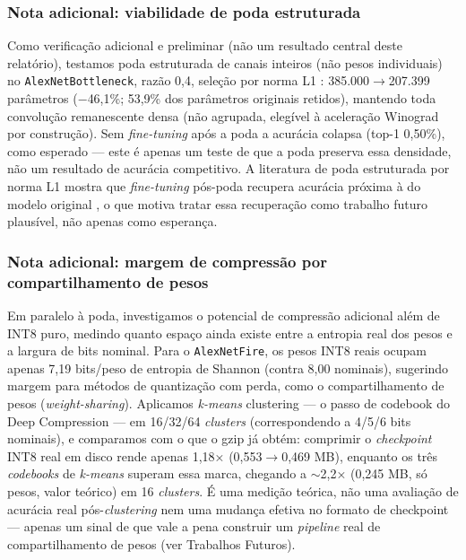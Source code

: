 \documentclass[conference]{IEEEtran}
\begin{document}
\subsubsection{Nota adicional: viabilidade de poda estruturada}

Como verificação adicional e preliminar (não um resultado central deste relatório), testamos poda
estruturada de canais inteiros (não pesos individuais) no \texttt{AlexNetBottleneck}, razão 0,4,
seleção por norma L1 \cite{li2017pruning}: 385.000$\to$207.399 parâmetros ($-$46,1\%; 53,9\% dos
parâmetros originais retidos), mantendo toda convolução remanescente densa (não agrupada,
elegível à aceleração Winograd por construção). Sem \textit{fine-tuning} após a poda a acurácia
colapsa (top-1 0,50\%), como esperado — este é apenas um teste de que a poda preserva essa
densidade, não um resultado de acurácia competitivo. A literatura de poda estruturada por
norma L1 mostra que \textit{fine-tuning} pós-poda recupera acurácia próxima à do modelo original
\cite{li2017pruning}, o que motiva tratar essa recuperação como trabalho futuro plausível, não
apenas como esperança.

\subsubsection{Nota adicional: margem de compressão por compartilhamento de pesos}

Em paralelo à poda, investigamos o potencial de compressão adicional além de INT8 puro,
medindo quanto espaço ainda existe entre a entropia real dos pesos e a largura de bits nominal.
Para o \texttt{AlexNetFire}, os pesos INT8 reais ocupam apenas 7,19 bits/peso de entropia de Shannon
(contra 8,00 nominais), sugerindo margem para métodos de quantização com perda, como o
compartilhamento de pesos (\textit{weight-sharing}). Aplicamos \textit{k-means} clustering — o passo de codebook do Deep
Compression \cite{han2016deepcompression} — em 16/32/64 \textit{clusters} (correspondendo a 4/5/6 bits
nominais), e comparamos com o que o gzip já obtém: comprimir o \textit{checkpoint} INT8 real em
disco rende apenas 1,18× (0,553$\to$0,469 MB), enquanto os três \textit{codebooks} de
\textit{k-means} superam essa marca, chegando a $\sim$2,2× (0,245 MB, só pesos, valor teórico) em
16 \textit{clusters}. É uma medição teórica, não uma avaliação de acurácia
real pós-\textit{clustering} nem uma mudança efetiva no formato de checkpoint — apenas um sinal de
que vale a pena construir um \textit{pipeline} real de compartilhamento de pesos (ver Trabalhos
Futuros).
\end{document}

